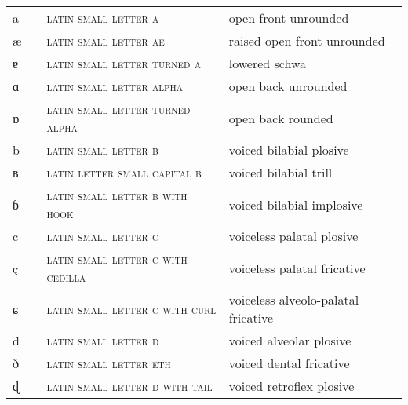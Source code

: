 \label{tab:ipa_letters}
 \tablelasttail{\bottomrule}
  
\begin{center}
\begin{xtabular}{ l L{1.2cm} L{5.4cm} L{4.2cm} }
a &  & \textsc{latin small letter a} & open front unrounded \\ 
æ &  & \textsc{latin small letter ae} & raised open front unrounded \\ 
ɐ &  & \textsc{latin small letter turned a} & lowered schwa \\ 
ɑ &  & \textsc{latin small letter alpha} & open back unrounded \\ 
ɒ &  & \textsc{latin small letter turned alpha} & open back rounded \\ 
b &  & \textsc{latin small letter b} & voiced bilabial plosive \\ 
ʙ &  & \textsc{latin letter small capital b} & voiced bilabial trill \\ 
ɓ &  & \textsc{latin small letter b with hook} & voiced bilabial implosive \\ 
c &  & \textsc{latin small letter c} & voiceless palatal plosive \\ 
ç &  & \textsc{latin small letter c with cedilla} & voiceless palatal fricative \\ 
ɕ &  & \textsc{latin small letter c with curl} & voiceless alveolo-palatal fricative \\ 
d &  & \textsc{latin small letter d} & voiced alveolar plosive \\ 
ð &  & \textsc{latin small letter eth} & voiced dental fricative \\ 
ɖ &  & \textsc{latin small letter d with tail} & voiced retroflex plosive \\ 

\end{xtabular}
\end{center}
